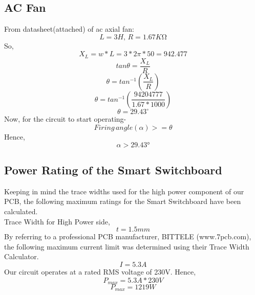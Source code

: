              \subsection{AC Fan}
             From datasheet(attached) of ac axial fan:
             \begin{equation*}
            L=3H,\,R=1.67K{\si\ohm}
             \end{equation*}
             So,
             \begin{equation}
             X_L=w*L=3*2\pi*50=942.477
             \end{equation}
             \begin{equation*}
             tan{\theta}=\frac{X_L}{R}
             \end{equation*}
             \begin{equation*}
             \theta=tan^{-1}(\frac{X_L}{R})
             \end{equation*}
             \begin{equation*}
             \theta=tan^{-1}(\frac{94204777}{1.67*1000})
             \end{equation*}
             \begin{equation}
             \theta=29.43^\circ
             \end{equation}
             Now, for the circuit to start operating-\\
             \begin{equation*}
             Firing\,angle(\alpha)>=\theta 
             \end{equation*}
             Hence,
             \begin{equation}   
             \alpha>\ang{29.43}
             \end{equation}
             
             \subsection{Power Rating of the Smart Switchboard}
             
             Keeping in mind the trace widths used for the high power component of our PCB, the following maximum ratings for the Smart Switchboard have been calculated.\\             
             Trace Width for High Power side, 
             \begin{equation*}
             t = 1.5mm
             \end{equation*}
             By referring to a professional PCB manufacturer, BITTELE (www.7pcb.com), the following maximum current limit was determined using their Trace Width Calculator.
             \begin{equation*}
             I = 5.3A
             \end{equation*}
             Our circuit operates at a rated RMS voltage of 230V. Hence,
             \begin{equation*}
    	         P_{max} = 5.3A * 230 V
             \end{equation*}
             \begin{equation}
	             P_{max} = 1219 W
             \end{equation}
             

